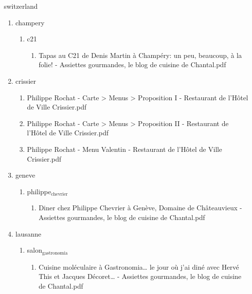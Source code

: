 \documentclass[11pt]{article}
\begin{document}
\item switzerland
\label{sec-1-1-1-1-21-10-8}
\begin{enumerate}
\item champery
\label{sec-1-1-1-1-21-10-8-1}
\begin{enumerate}
\item c21
\label{sec-1-1-1-1-21-10-8-1-1}
\begin{enumerate}
\item Tapas au C21 de Denis Martin à Champéry: un peu, beaucoup, à la folie! - Assiettes gourmandes, le blog de cuisine de Chantal.pdf
\label{sec-1-1-1-1-21-10-8-1-1-1}
\end{enumerate}
\end{enumerate}

\item crissier
\label{sec-1-1-1-1-21-10-8-2}
\begin{enumerate}
\item Philippe Rochat - Carte > Menus > Proposition I - Restaurant de l'Hôtel de Ville Crissier.pdf
\label{sec-1-1-1-1-21-10-8-2-1}

\item Philippe Rochat - Carte > Menus > Proposition II - Restaurant de l'Hôtel de Ville Crissier.pdf
\label{sec-1-1-1-1-21-10-8-2-2}

\item Philippe Rochat - Menu Valentin - Restaurant de l'Hôtel de Ville Crissier.pdf
\label{sec-1-1-1-1-21-10-8-2-3}
\end{enumerate}

\item geneve
\label{sec-1-1-1-1-21-10-8-3}
\begin{enumerate}
\item philippe$_{\text{chevrier}}$
\label{sec-1-1-1-1-21-10-8-3-1}
\begin{enumerate}
\item Diner chez Philippe Chevrier à Genève, Domaine de Châteauvieux - Assiettes gourmandes, le blog de cuisine de Chantal.pdf
\label{sec-1-1-1-1-21-10-8-3-1-1}
\end{enumerate}
\end{enumerate}

\item lausanne
\label{sec-1-1-1-1-21-10-8-4}
\begin{enumerate}
\item salon$_{\text{gastronomia}}$
\label{sec-1-1-1-1-21-10-8-4-1}
\begin{enumerate}
\item Cuisine moléculaire à Gastronomia\ldots{} le jour où j'ai diné avec Hervé This et Jacques Décoret\ldots{} - Assiettes gourmandes, le blog de cuisine de Chantal.pdf
\label{sec-1-1-1-1-21-10-8-4-1-1}
\end{enumerate}
\end{enumerate}


\end{enumerate}
\end{document}
